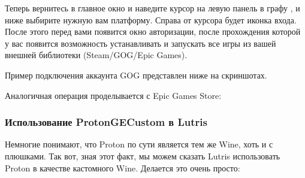 \documentclass[letterpaper,10pt,russian,openany]{sphinxmanual}
\begin{document}
\noindent{}

\sphinxAtStartPar
{}

\noindent{}

\sphinxAtStartPar
{} Теперь вернитесь в главное окно и наведите курсор на левую панель в графу , и ниже выбирите нужную вам платформу.
Справа от курсора будет иконка входа. После этого перед вами появится окно авторизации, после прохождения которой у вас появится
возможность устанавливать и запускать все игры из вашей внешней библиотеки (Steam/GOG/Epic Games).

\sphinxAtStartPar
Пример подключения аккаунта GOG представлен ниже на скриншотах.

\sphinxAtStartPar
{}

\noindent{}

\sphinxAtStartPar
{}

\noindent{}

\sphinxAtStartPar
{}

\noindent{}

\sphinxAtStartPar
Аналогичная операция проделывается с Epic Games Store:

\sphinxAtStartPar
{}

\noindent{}

\sphinxAtStartPar
{}

\noindent{}

\sphinxAtStartPar
{}

\noindent{}

\sphinxAtStartPar
{}

\sphinxAtStartPar
{}

\ignorespaces 

\subsubsection{Использование Proton\sphinxhyphen{}GE\sphinxhyphen{}Custom в Lutris}
\label{\detokenize{source/linux-gaming:proton-ge-custom-lutris}}\label{\detokenize{source/linux-gaming:proton-ge-with-lutris}}\label{\detokenize{source/linux-gaming:index-14}}
\sphinxAtStartPar
Немногие понимают, что Proton по сути является тем же Wine, хоть и с плюшками.
Так вот, зная этот факт, мы можем сказать Lutris использовать Proton в качестве кастомного Wine.
Делается это очень просто:
\end{document}
